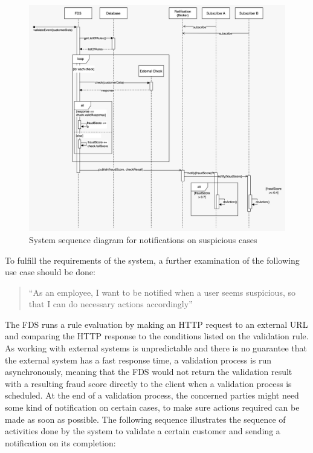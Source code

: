 \begin{figure}[!h]
 \includegraphics[width=\textwidth]{diagrams/sequence_notification.jpeg}
 \caption{System sequence diagram for notifications on suspicious cases}
 \label{fig:notif-sequence}
\end{figure}

To fulfill the requirements of the system, a further examination of the following use case should be done:

\begin{quotation}
 \enquote{As an employee, I want to be notified when a user seems suspicious, so that I can do necessary actions accordingly} 
\end{quotation}

The FDS runs a rule evaluation by making an HTTP request to an external URL and comparing the HTTP response to the conditions listed on the validation rule. As working with external systems is unpredictable and there is no guarantee that the external system has a fast response time, a validation process is run asynchronously, meaning that the FDS would not return the validation result with a resulting fraud score directly to the client when a validation process is scheduled. At the end of a validation process, the concerned parties might need some kind of notification on certain cases, to make sure actions required can be made as soon as possible. The following sequence illustrates the sequence of activities done by the system to validate a certain customer and sending a notification on its completion:


